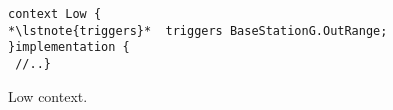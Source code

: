 \begin{figure}[!tb]
\begin{lstlisting}[style=conescframe]
context Low {
*\lstnote{triggers}*  triggers BaseStationG.OutRange;
}implementation {
 //..}
\end{lstlisting}
\vspace{-4mm}
\caption{Low context.}
  \label{fig:lc}
\vspace{-2mm}
\end{figure}